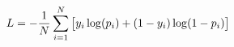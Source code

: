 \documentclass[preview]{standalone}
\begin{document}
\begin{align*}
\special{dvisvgm:raw <g id='unique000'>}L = -\frac{1}{N}\sum_{i=1}^{N}\big[ \special{dvisvgm:raw </g>}\special{dvisvgm:raw <g id='unique001'>}y_i \log(p_i) + (1 - y_i)\log(1 - p_i) \special{dvisvgm:raw </g>}\special{dvisvgm:raw <g id='unique002'>}\big]\special{dvisvgm:raw </g>}
\end{align*}
\end{document}
